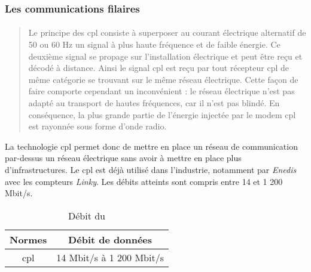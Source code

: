 \subsubsection{Les communications filaires}
\label{sec:communicationFilaire}

\paragraph{}
\label{sec:cpl}

\blockquote{Le principe des \gls{cpl} consiste à superposer au courant électrique alternatif de 50 ou 60 Hz
    un signal à plus haute fréquence et de faible énergie. Ce deuxième signal se propage sur l’installation
    électrique et peut être reçu et décodé à distance. Ainsi le signal \gls{cpl} est reçu par tout récepteur
    \gls{cpl} de même catégorie se trouvant sur le même réseau électrique. Cette façon de faire comporte cependant un
    inconvénient : le réseau électrique n'est pas adapté au transport de hautes fréquences, car il n'est pas blindé.
    En conséquence, la plus grande partie de l'énergie injectée par le modem \gls{cpl} est rayonnée sous forme
    d'onde radio.}{\cite{cpl}}

La technologie \gls{cpl} permet donc de mettre en place un réseau de communication par-dessus un réseau électrique sans
avoir à mettre en place plus d'infrastructures. Le \gls{cpl} est déjà utilisé dans l'industrie, notamment par \textit{Enedis}
avec les compteurs \textit{Linky}. Les débits atteints sont compris entre 14 et 1 200 Mbit/s.

\begin{table}[H]
    \centering
    \begin{tabular}{|c|c|}
        \hline
        \rowcolor{tableColorDark} Normes & Débit de données         \\
        \hline

        \gls{cpl}                        & 14 Mbit/s à 1 200 Mbit/s \\\hline
    \end{tabular}
    \label{tab:debitCPL}
    \caption{Débit du }
    \nocite{cpl}
\end{table}

\paragraph{}
\label{sec:ethernet}

